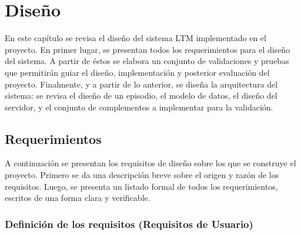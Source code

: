 \chapter{Diseño}\label{chapter:diseno}


En este capítulo se revisa el diseño del sistema LTM implementado en el proyecto. En primer lugar, se presentan todos los requerimientos para el diseño del sistema. A partir de éstos se elabora un conjunto de validaciones y pruebas que permitirán guiar el diseño, implementación y posterior evaluación del proyecto. Finalmente, y a partir de lo anterior, se diseña la arquitectura del sistema: se revisa el diseño de un episodio, el modelo de datos, el diseño del servidor, y el conjunto de complementos a implementar para la validación.



\section{Requerimientos}

A continuación se presentan los requisitos de diseño sobre los que se construye el proyecto. Primero se da una descripción breve sobre el origen y razón de los requisitos. Luego, se presenta un listado formal de todos los requerimientos, escritos de una forma clara y verificable.
 
\subsection{Definición de los requisitos (Requisitos de Usuario)}



